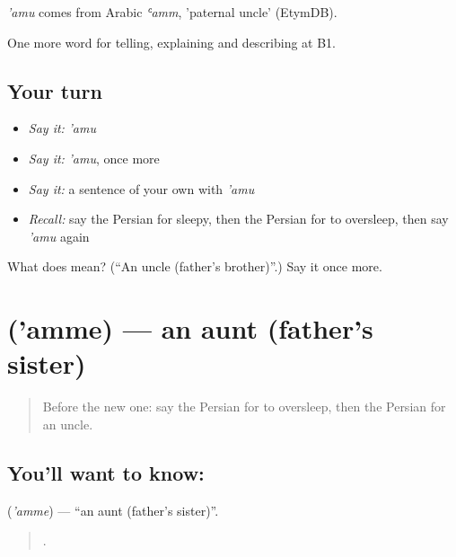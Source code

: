 \begin{cousinweb}
\emph{'amu} comes from Arabic \emph{ʿamm}, 'paternal uncle' (EtymDB).
\end{cousinweb}

\begin{grammarlens}[title={What you've built}]
One more word for telling, explaining and describing at B1.
\end{grammarlens}

\subsection*{Your turn}
\begin{itemize}
\raggedright
  \item \emph{Say it:} \emph{'amu}
  \item \emph{Say it:} \emph{'amu}, once more
  \item \emph{Say it:} a sentence of your own with \emph{'amu}
  \item \emph{Recall:} say the Persian for sleepy, then the Persian for to oversleep, then say \emph{'amu} again
\end{itemize}

\begin{tcolorbox}[breakable,colback=teal!4,colframe=teal!35!black,title={Before you move on}]
What does  mean? (\textquotedblleft{}An uncle (father's brother)\textquotedblright{}.) Say it once more.
\end{tcolorbox}
\section[\texorpdfstring{\fa{عمه} ('amme)}{عمه ('amme)}]{ ('amme) — an aunt (father's sister)}

\label{lesson:FA-C500-amme}



\begin{quote}
Before the new one: say the Persian for to oversleep, then the Persian for an uncle.
\end{quote}

\subsection*{You'll want to know: }
\textbf{} (\emph{'amme}) — \textquotedblleft{}an aunt (father's sister)\textquotedblright{}.

\begin{quote}
    .
\end{quote}

